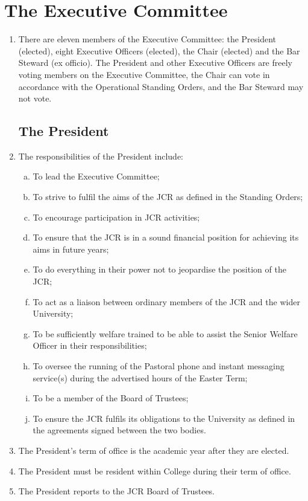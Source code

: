 \documentclass[12pt]{article}
\begin{document}
\section{The Executive Committee}
\begin{enumerate}
    \item There are eleven members of the Executive Committee: the President (elected), eight Executive Officers (elected), the Chair (elected) and the Bar Steward (ex officio).
    The President and other Executive Officers are freely voting members on the Executive Committee, the Chair can vote in accordance with the Operational Standing Orders, and the Bar Steward may not vote.
    \subsection{The President}
    \item The responsibilities of the President include:
    \begin{enumerate}[(a)]
        \item To lead the Executive Committee;
        \item To strive to fulfil the aims of the JCR as defined in the Standing Orders;
        \item To encourage participation in JCR activities;
        \item To ensure that the JCR is in a sound financial position for achieving its aims in future years;
        \item To do everything in their power not to jeopardise the position of the JCR;
        \item To act as a liaison between ordinary members of the JCR and the wider University;
        \item To be sufficiently welfare trained to be able to assist the Senior Welfare Officer in their responsibilities;
        \item To oversee the running of the Pastoral phone and instant messaging service(s) during the advertised hours of the Easter Term;
        \item To be a member of the Board of Trustees;
        \item To ensure the JCR fulfils its obligations to the University as defined in the agreements signed between the two bodies.
    \end{enumerate}
    \item The President's term of office is the academic year after they are elected.
    \item The President must be resident within College during their term of office.
    \item The President reports to the JCR Board of Trustees.

\end{enumerate}
\end{document}
